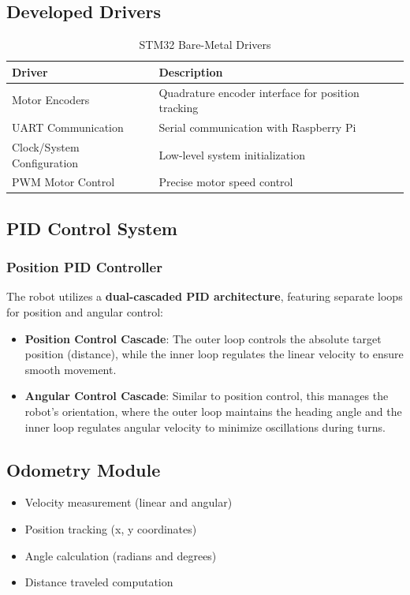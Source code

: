 \documentclass[12pt,a4paper]{article}
\begin{document}
	\subsection{Developed Drivers}
	\begin{table}[H]
		\centering
		\begin{tabularx}{\textwidth}{|l|X|}
			\hline
			\textbf{Driver} & \textbf{Description} \\
			\hline
			Motor Encoders & Quadrature encoder interface for position tracking \\
			UART Communication & Serial communication with Raspberry Pi \\
			Clock/System Configuration & Low-level system initialization \\
			PWM Motor Control & Precise motor speed control \\
			\hline
		\end{tabularx}
		\caption{STM32 Bare-Metal Drivers}
	\end{table}
	
	\subsection{PID Control System}
	
	\subsubsection{Position PID Controller}
	The robot utilizes a \textbf{dual-cascaded PID architecture}, featuring separate loops for position and angular control:
	\begin{itemize}
		\item \textbf{Position Control Cascade}: The outer loop controls the absolute target position (distance), while the inner loop regulates the linear velocity to ensure smooth movement.
		\item \textbf{Angular Control Cascade}: Similar to position control, this manages the robot's orientation, where the outer loop maintains the heading angle and the inner loop regulates angular velocity to minimize oscillations during turns.
	\end{itemize}
	
	\subsection{Odometry Module}
	\begin{itemize}
		\item Velocity measurement (linear and angular)
		\item Position tracking (x, y coordinates)
		\item Angle calculation (radians and degrees)
		\item Distance traveled computation
	\end{itemize}
	
\end{document}
